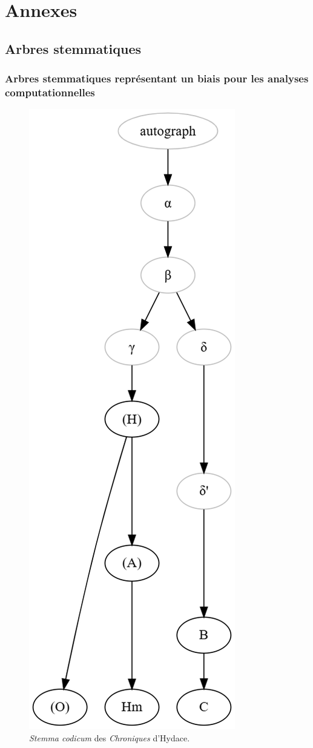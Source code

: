 \documentclass[a4paper,twoside,12pt]{book}
\begin{document}
	






\appendix
\part*{Annexes}
\chapter{Arbres stemmatiques}

\section{Arbres stemmatiques représentant un biais pour les analyses computationnelles}
\label{stemmabifid}
\begin{figure}[p]  
	\centering
	\includegraphics[width=0.4\linewidth]{img/stemmaIdace.png}
	\caption{\textit{Stemma codicum} des \textit{Chroniques} d'Hydace.}
	\label{fig:stemma1}
\end{figure}
\end{document}
